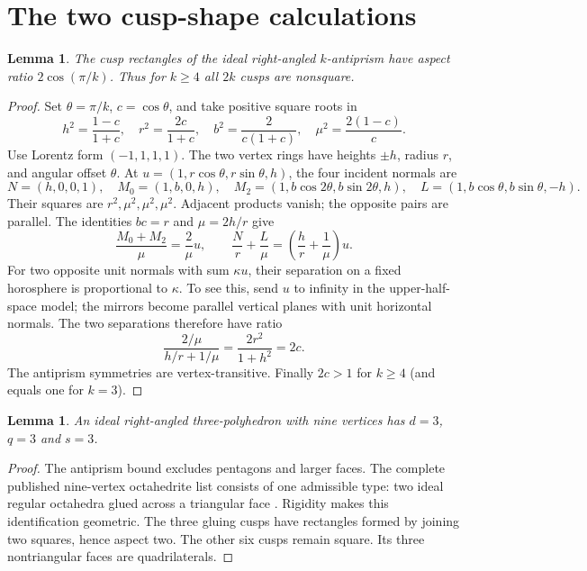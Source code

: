 \documentclass[11pt]{article}
\newtheorem{lemma}[theorem]{Lemma}
\begin{document}
\section{The two cusp-shape calculations}
\begin{lemma}\label{lem:antiprism}
The cusp rectangles of the ideal right-angled $k$-antiprism have
aspect ratio $2\cos(\pi/k)$. Thus for $k\ge4$ all $2k$ cusps
are nonsquare.
\end{lemma}
\begin{proof}
Set $\theta=\pi/k$, $c=\cos\theta$, and take positive square roots in
\[
 h^2=\frac{1-c}{1+c},\quad r^2=\frac{2c}{1+c},\quad
 b^2=\frac{2}{c(1+c)},\quad \mu^2=\frac{2(1-c)}{c}.
\]
Use Lorentz form $(-1,1,1,1)$. The two vertex rings have heights
$\pm h$, radius $r$, and angular offset $\theta$. At
$u=(1,r\cos\theta,r\sin\theta,h)$, the four incident normals are
\[
 N=(h,0,0,1),\quad M_0=(1,b,0,h),\quad
 M_2=(1,b\cos2\theta,b\sin2\theta,h),\quad
 L=(1,b\cos\theta,b\sin\theta,-h).
\]
Their squares are $r^2,\mu^2,\mu^2,\mu^2$. Adjacent products vanish;
the opposite pairs are parallel. The identities $bc=r$ and
$\mu=2h/r$ give
\[
 \frac{M_0+M_2}{\mu}=\frac2\mu u,\qquad
 \frac Nr+\frac L\mu=\left(\frac hr+\frac1\mu\right)u.
\]
For two opposite unit normals with sum $\kappa u$, their separation
on a fixed horosphere is proportional to $\kappa$. To see this,
send $u$ to infinity in the upper-half-space model; the mirrors become
parallel vertical planes with unit horizontal normals. The two
separations therefore have ratio
\[
 \frac{2/\mu}{h/r+1/\mu}
 =\frac{2r^2}{1+h^2}=2c.
\]
The antiprism symmetries are vertex-transitive. Finally $2c>1$ for
$k\ge4$ (and equals one for $k=3$).
\end{proof}

\begin{lemma}\label{lem:nine}
An ideal right-angled three-polyhedron with nine vertices has
$d=3$, $q=3$ and $s=3$.
\end{lemma}
\begin{proof}
The antiprism bound excludes pentagons and larger faces. The complete
published nine-vertex octahedrite list consists of one admissible type:
two ideal regular octahedra glued across a triangular face
\cite[Section~4.3, Case~D2 and Figure~6]{Kolpakov}. Rigidity makes
this identification geometric. The three gluing cusps have rectangles
formed by joining two squares, hence aspect two. The other six cusps
remain square. Its three nontriangular faces are quadrilaterals.
\end{proof}
\end{document}
